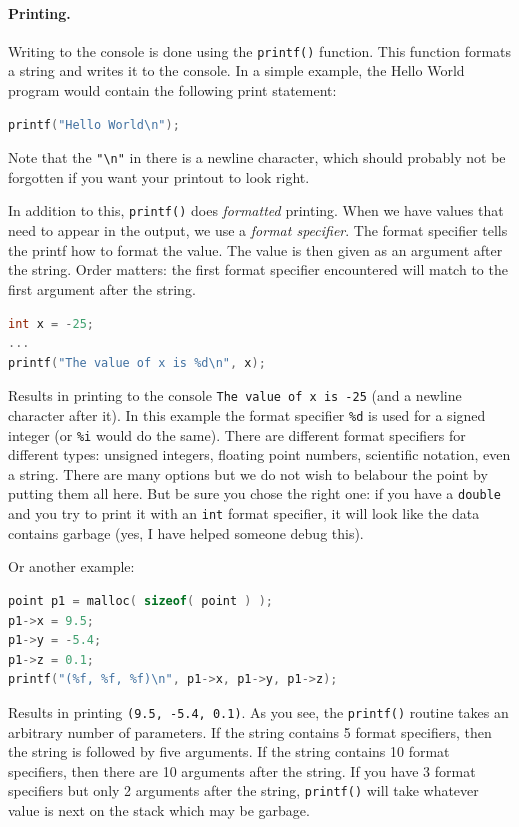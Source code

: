 \documentclass[a4paper]{report}
\begin{document}
\paragraph{Printing.}

Writing to the console is done using the \texttt{printf()} function. This function formats a string and writes it to the console. In a simple example, the Hello World program would contain the following print statement:

\begin{lstlisting}[language=C]
printf("Hello World\n");
\end{lstlisting}

Note that the \texttt{"\textbackslash n"} in there is a newline character, which should probably not be forgotten if you want your printout to look right.

In addition to this, \texttt{printf()} does \textit{formatted} printing. When we have values that need to appear in the output, we use a \textit{format specifier}. The format specifier tells the printf how to format the value. The value is then given as an argument after the string. Order matters: the first format specifier encountered will match to the first argument after the string.

\begin{lstlisting}[language=C]
int x = -25;
...
printf("The value of x is %d\n", x);
\end{lstlisting}

Results in printing to the console \texttt{The value of x is -25} (and a newline character after it). In this example the format specifier \texttt{\%d} is used for a signed integer (or \texttt{\%i} would do the same). There are different format specifiers for different types: unsigned integers, floating point numbers, scientific notation, even a string. There are many options but we do not wish to belabour the point by putting them all here. But be sure you chose the right one: if you have a \texttt{double} and you try to print it with an \texttt{int} format specifier, it will look like the data contains garbage (yes, I have helped someone debug this).

Or another example:
\begin{lstlisting}[language=C]
point p1 = malloc( sizeof( point ) );
p1->x = 9.5;
p1->y = -5.4;
p1->z = 0.1;
printf("(%f, %f, %f)\n", p1->x, p1->y, p1->z);
\end{lstlisting}

Results in printing \texttt{(9.5, -5.4, 0.1)}. As you see, the \texttt{printf()} routine takes an arbitrary number of parameters. If the string contains 5 format specifiers, then the string is followed by five arguments. If the string contains 10 format specifiers, then there are 10 arguments after the string. If you have 3 format specifiers but only 2 arguments after the string, \texttt{printf()} will take whatever value is next on the stack which may be garbage.
\end{document}
